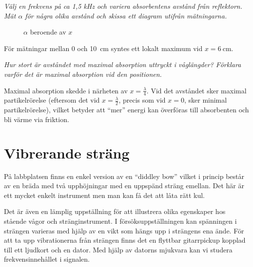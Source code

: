 \documentclass[a4paper,12pt]{article}  %
\begin{document}
\emph{Välj en frekvens på ca 1,5 kHz och variera absorbentens avstånd från
  reflektorn. Mät $\alpha$ för några olika avstånd och skissa ett diagram
  utifrån mätningarna.}

\begin{figure}[h]
  \centering
  \caption{$\alpha$ beroende av $x$}%
  \label{fig:f_alpha}
\end{figure}


För mätningar mellan $0$ och \SI[scientific-notation=false]{10}{\centi\meter}
syntes ett lokalt maximum vid $x=\SI[scientific-notation=false]{6}{\centi\meter}$.

\emph{Hur stort är avståndet med maximal absorption uttryckt i våglängder?
  Förklara varför det är maximal absorption vid den positionen.}

Maximal absorption skedde i närheten av $x=\frac{\lambda}{4}$. Vid det avståndet
sker maximal partikelrörelse (eftersom det vid $x=\frac{\lambda}{2}$, precis
som vid $x=0$, sker minimal partikelrörelse), vilket betyder att ``mer'' energi
kan överföras till absorbenten och bli värme via friktion.

\section{Vibrerande sträng}

\begin{displayquote}
På labbplatsen finns en enkel version av en ``diddley bow'' vilket i princip
består av en bräda med två upphöjningar med en uppspänd sträng emellan. Det här
är ett mycket enkelt instrument men man kan få det att låta rätt kul.

Det är även en lämplig uppställning för att illustrera olika egenskaper hos
stående vågor och stränginstrument. I försöksuppställningen kan spänningen i
strängen varieras med hjälp av en vikt som hängs upp i strängens ena ände. För att
ta upp vibrationerna från strängen finns det en flyttbar gitarrpickup kopplad
till ett ljudkort och en dator. Med hjälp av datorns mjukvara kan vi studera
frekvensinnehållet i signalen.
\end{displayquote}
\end{document}
